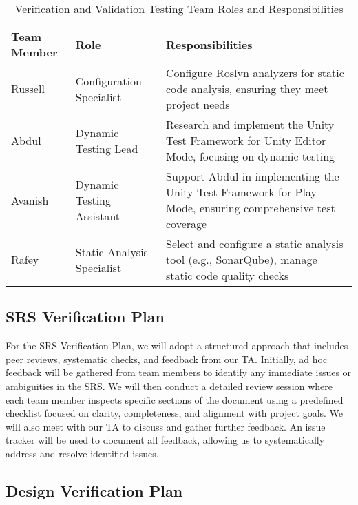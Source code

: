 \documentclass[12pt, titlepage]{article}
\begin{document}
\begin{table}[h!]
  \centering
  \begin{tabularx}{\textwidth}{|l|l|X|}
    \hline
    \textbf{Team Member} & \textbf{Role}              & \textbf{Responsibilities}                                                                                  \\ \hline
    Russell              & Configuration Specialist   & Configure Roslyn analyzers for static code analysis, ensuring they meet project needs                      \\ \hline
    Abdul                & Dynamic Testing Lead       & Research and implement the Unity Test Framework for Unity Editor Mode, focusing on dynamic testing         \\ \hline
    Avanish              & Dynamic Testing Assistant  & Support Abdul in implementing the Unity Test Framework for Play Mode, ensuring comprehensive test coverage \\ \hline
    Rafey                & Static Analysis Specialist & Select and configure a static analysis tool (e.g., SonarQube), manage static code quality checks           \\ \hline
  \end{tabularx}
  \caption{Verification and Validation Testing Team Roles and Responsibilities}
\end{table}

\subsection{SRS Verification Plan}

For the SRS Verification Plan, we will adopt a structured approach that includes peer reviews, systematic checks, and feedback from our TA. Initially, ad hoc feedback will be gathered from team members to identify any immediate issues or ambiguities in the SRS. We will then conduct a detailed review session where each team member inspects specific sections of the document using a predefined checklist focused on clarity, completeness, and alignment with project goals. We will also meet with our TA to discuss and gather further feedback. An issue tracker will be used to document all feedback, allowing us to systematically address and resolve identified issues.

\subsection{Design Verification Plan}
\end{document}
